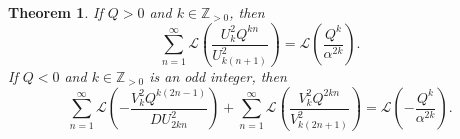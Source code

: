 \documentclass[10pt]{article}
\newtheorem{theorem}{Theorem}
\theoremstyle{definition}
\begin{document}
\begin{theorem}\label{thm:generalized_bridgeman}
    If $Q > 0$ and $k \in \mathbb{Z}_{>0}$, then
    \begin{equation}
        \sum_{n=1}^{\infty}\mathcal{L}\left(\frac{U^2_k Q^{kn}}{U^2_{k(n+1)}}\right) = \mathcal{L}\left(\frac{Q^k}{\alpha^{2k}}\right).\label{eq:lucas_series_pos}
    \end{equation}
    If $Q < 0$ and $k \in \mathbb{Z}_{>0}$ is an odd integer, then 
    \begin{equation}
       \sum_{n=1}^{\infty}\mathcal{L}\left(-\frac{V^2_k Q^{k(2n-1)}}{D U^2_{2kn} }\right) + \sum_{n=1}^{\infty}\mathcal{L}\left(\frac{V^2_k Q^{2kn}}{ V^2_{k(2n+1)}}\right) = \mathcal{L}\left(-\frac{Q^k}{\alpha^{2k}}\right).\label{eq:lucas_series_neg}
    \end{equation} 
\end{theorem}
\end{document}
